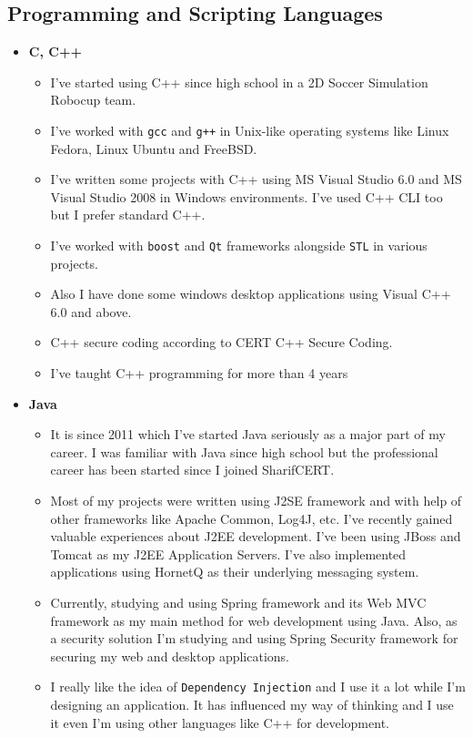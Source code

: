 \documentclass[12pt,a4paper]{article}
\begin{document}
	\subsection{Programming and Scripting Languages}
		\begin{itemize}
			\item \textbf{C, C++}
				\begin{itemize}
					\item I've started using C++ since high school in a 2D Soccer Simulation Robocup team.
					\item I've worked with \texttt{gcc} and \texttt{g++} in Unix-like operating systems like Linux Fedora, Linux Ubuntu and FreeBSD.
					\item I've written some projects with C++ using MS Visual Studio 6.0 and MS Visual Studio 2008 in Windows environments. I've used C++ CLI too but I prefer standard C++.
					\item I've worked with \texttt{boost} and \texttt{Qt} frameworks alongside \texttt{STL} in various projects.
					\item Also I have done some windows desktop applications using Visual C++ 6.0 and above.
					\item C++ secure coding according to CERT C++ Secure Coding.
					\item I've taught C++ programming for more than 4 years
				\end{itemize}
			\item \textbf{Java}
				\begin{itemize}
					\item It is since 2011 which I've started Java seriously as a major part of my career. I was familiar with Java since high school but the professional career has been started since I joined SharifCERT.
					\item Most of my projects were written using J2SE framework and with help of other frameworks like Apache Common, Log4J, etc. I've recently gained valuable experiences about J2EE development. I've been using JBoss and Tomcat as my J2EE Application Servers. I've also implemented applications using HornetQ as their underlying messaging system.
					\item Currently, studying and using Spring framework and its Web MVC framework as my main method for web development using Java. Also, as a security solution I'm studying and using Spring Security framework for securing my web and desktop applications.
					\item I really like the idea of \texttt{Dependency Injection} and I use it a lot while I'm designing an application. It has influenced my way of thinking and I use it even I'm using other languages like C++ for development.

\end{itemize}
\end{itemize}
\end{document}
